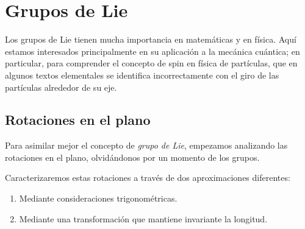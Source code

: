 %
%

\chapter{Grupos de Lie}
Los grupos de Lie tienen mucha importancia en matemáticas y en física.
Aquí estamos interesados principalmente en su aplicación a la mecánica cuántica; en particular, para comprender el concepto de spin en física de partículas, que en algunos textos elementales se identifica incorrectamente con el giro de las partículas alrededor de su eje.

\section{Rotaciones en el plano}
Para asimilar mejor el concepto de \emph{grupo de Lie}, empezamos analizando las rotaciones en el plano, olvidándonos por un momento de los grupos.

Caracterizaremos estas rotaciones a través de dos aproximaciones diferentes:
\begin{enumerate}
\item Mediante consideraciones trigonométricas.
\item Mediante una transformación que mantiene invariante la longitud.
\end{enumerate}

